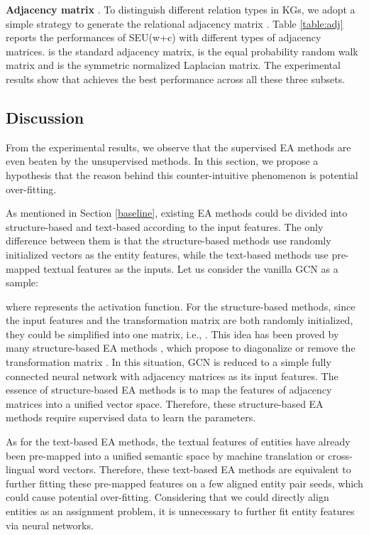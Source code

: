 \documentclass[11pt]{article}
\begin{document}
\textbf{Adjacency matrix }.
To distinguish different relation types in KGs, we adopt a simple strategy to generate the relational adjacency matrix .
Table \ref{table:adj} reports the performances of SEU(w+c) with different types of adjacency matrices.
 is the standard adjacency matrix,  is the equal probability random walk matrix and  is the symmetric normalized Laplacian matrix.
The experimental results show that  achieves the best performance across all these three subsets.

\subsection{Discussion}
\label{sec:dis}
From the experimental results, we observe that the supervised EA methods are even beaten by the unsupervised methods.
In this section, we propose a hypothesis that the reason behind this counter-intuitive phenomenon is potential over-fitting.

As mentioned in Section \ref{baseline}, existing EA methods could be divided into structure-based and text-based according to the input features.
The only difference between them is that the structure-based methods use randomly initialized vectors as the entity features, while the text-based methods use pre-mapped textual features as the inputs.
Let us consider the vanilla GCN as a sample:

where  represents the activation function.
For the structure-based methods, since the input features  and the transformation matrix  are both randomly initialized, they could be simplified into one matrix, i.e., .
This idea has been proved by many structure-based EA methods \cite{DBLP:conf/acl/CaoLLLLC19,DBLP:conf/wsdm/MaoWXLW20}, which propose to diagonalize or remove the transformation matrix .
In this situation, GCN is reduced to a simple fully connected neural network with adjacency matrices as its input features.
The essence of structure-based EA methods is to map the features of adjacency matrices into a unified vector space.
Therefore, these structure-based EA methods require supervised data to learn the parameters.

As for the text-based EA methods, the textual features of entities have already been pre-mapped into a unified semantic space by machine translation or cross-lingual word vectors.
Therefore, these text-based EA methods are equivalent to further fitting these pre-mapped features on a few aligned entity pair seeds, which could cause potential over-fitting.
Considering that we could directly align entities as an assignment problem, it is unnecessary to further fit entity features via neural networks.
\end{document}
